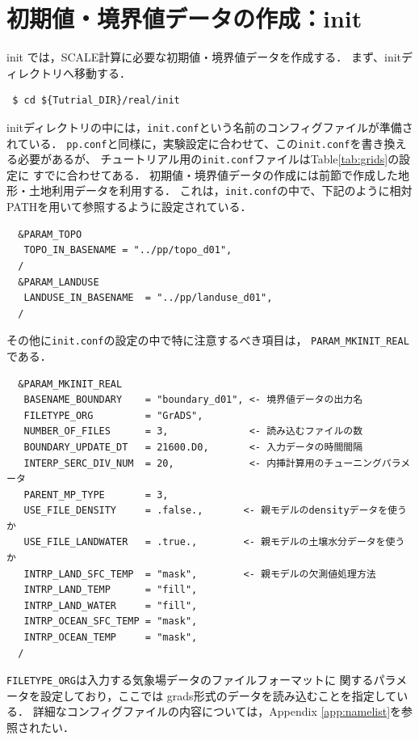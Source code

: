 
\section{初期値・境界値データの作成：init}

init では，SCALE計算に必要な初期値・境界値データを作成する．
まず、initディレクトリへ移動する．
\begin{verbatim}
 $ cd ${Tutrial_DIR}/real/init
\end{verbatim}

initディレクトリの中には，\verb|init.conf|という名前のコンフィグファイルが準備されている．
\verb|pp.conf|と同様に，実験設定に合わせて、この\verb|init.conf|を書き換える必要があるが、
チュートリアル用の\verb|init.conf|ファイルはTable\ref{tab:grids}の設定に
すでに合わせてある．
初期値・境界値データの作成には前節で作成した地形・土地利用データを利用する．
これは，\verb|init.conf|の中で、下記のように相対PATHを用いて参照するように設定されている．

\begin{verbatim}
  &PARAM_TOPO
   TOPO_IN_BASENAME = "../pp/topo_d01",
  /
  &PARAM_LANDUSE
   LANDUSE_IN_BASENAME  = "../pp/landuse_d01",
  /
\end{verbatim}
その他に\verb|init.conf|の設定の中で特に注意するべき項目は，
\verb|PARAM_MKINIT_REAL|である．
\begin{verbatim}
  &PARAM_MKINIT_REAL
   BASENAME_BOUNDARY    = "boundary_d01", <- 境界値データの出力名
   FILETYPE_ORG         = "GrADS",
   NUMBER_OF_FILES      = 3,              <- 読み込むファイルの数
   BOUNDARY_UPDATE_DT   = 21600.D0,       <- 入力データの時間間隔
   INTERP_SERC_DIV_NUM  = 20,             <- 内挿計算用のチューニングパラメータ
   PARENT_MP_TYPE       = 3,
   USE_FILE_DENSITY     = .false.,       <- 親モデルのdensityデータを使うか
   USE_FILE_LANDWATER   = .true.,        <- 親モデルの土壌水分データを使うか
   INTRP_LAND_SFC_TEMP  = "mask",        <- 親モデルの欠測値処理方法
   INTRP_LAND_TEMP      = "fill",
   INTRP_LAND_WATER     = "fill",
   INTRP_OCEAN_SFC_TEMP = "mask",
   INTRP_OCEAN_TEMP     = "mask",
  /
\end{verbatim}

\verb|FILETYPE_ORG|は入力する気象場データのファイルフォーマットに
関するパラメータを設定しており，ここでは
grads形式のデータを読み込むことを指定している．
詳細なコンフィグファイルの内容については，Appendix \ref{app:namelist}を参照されたい．

